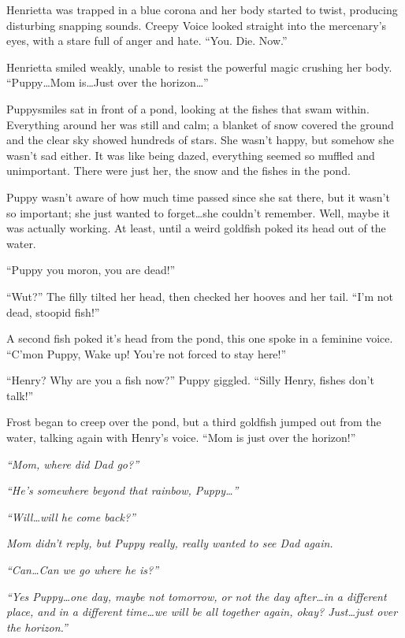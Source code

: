 Henrietta was trapped in a blue corona and her body started to twist, producing disturbing snapping sounds. Creepy Voice looked straight into the mercenary's eyes, with a stare full of anger and hate. ``You. Die. Now.''

Henrietta smiled weakly, unable to resist the powerful magic crushing her body. ``Puppy\dots Mom is\dots Just over the horizon\dots''

\horizonline

Puppysmiles sat in front of a pond, looking at the fishes that swam within. Everything around her was still and calm; a blanket of snow covered the ground and the clear sky showed hundreds of stars. She wasn't happy, but somehow she wasn't sad either. It was like being dazed, everything seemed so muffled and unimportant. There were just her, the snow and the fishes in the pond.

Puppy wasn't aware of how much time passed since she sat there, but it wasn't so important; she just wanted to forget\dots she couldn't remember. Well, maybe it was actually working. At least, until a weird goldfish poked its head out of the water.

``Puppy you moron, you are dead!''

``Wut?'' The filly tilted her head, then checked her hooves and her tail. ``I'm not dead, stoopid fish!''

A second fish poked it's head from the pond, this one spoke in a feminine voice. ``C'mon Puppy, Wake up! You're not forced to stay here!''

``Henry? Why are you a fish now?'' Puppy giggled. ``Silly Henry, fishes don't talk!''

Frost began to creep over the pond, but a third goldfish jumped out from the water, talking again with Henry's voice. ``Mom is just over the horizon!''

\emph{``Mom, where did Dad go?''}

\emph{``He's somewhere beyond that rainbow, Puppy\dots''}

\emph{``Will\dots will he come back?''}

\emph{Mom didn't reply, but Puppy really, really wanted to see Dad again.}

\emph{``Can\dots Can we go where he is?''}

\emph{``Yes Puppy\dots one day, maybe not tomorrow, or not the day after\dots in a different place, and in a different time\dots we will be all together again, okay? Just\dots just over the horizon.''}

